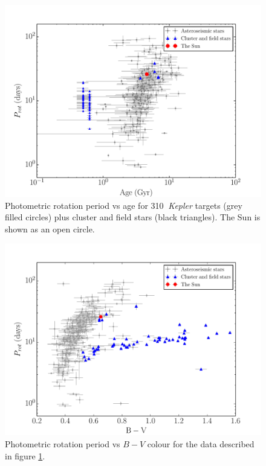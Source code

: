 \documentclass[useAMS, usenatbib]{mn2e}
\newcommand{\nastero}{310}
\begin{document}
\begin{figure}
\begin{center}
\includegraphics[width=6in, clip=true]{p_vs_a_paper2.pdf}
\caption{Photometric rotation period vs age for \nastero$~$ {\it Kepler}
	targets (grey filled circles) plus cluster and field stars (black
	triangles). The Sun is shown as an open circle.
\label{fig:p_vs_a}}
\end{center}
\end{figure}

\begin{figure}
\begin{center}
\includegraphics[width=6in, clip=true, trim=0 0 0.5in 0]{p_vs_bv_paper2.pdf}
\caption{Photometric rotation period vs $B-V$ colour for the data described in
	figure \ref{fig:p_vs_a}.
\label{fig:3d}}
\end{center}
\end{figure}
\end{document}

